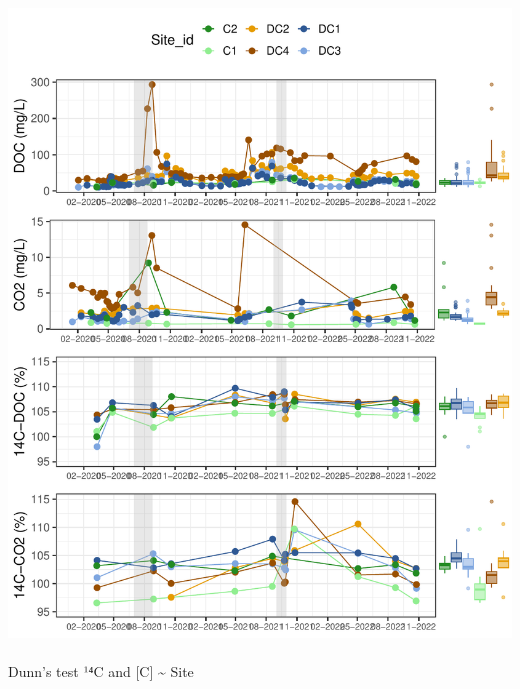 \documentclass[
  letterpaper,
  DIV=11,
  numbers=noendperiod]{scrartcl}
\makeatletter
\let\oldparagraph\paragraph
\renewcommand{\paragraph}{
    \@ifstar
      \xxxParagraphStar
      \xxxParagraphNoStar
  }
\newcommand{\xxxParagraphStar}[1]{\oldparagraph*{#1}\mbox{}}
\newcommand{\xxxParagraphNoStar}[1]{\oldparagraph{#1}\mbox{}}
\makeatother
\begin{document}
\includegraphics{index_files/figure-pdf/unnamed-chunk-3-1.pdf}

\paragraph{Dunn's test \textbar{} ¹⁴C and {[}C{]} \textasciitilde{}
Site}\label{dunns-test-uxb9ux2074c-and-c-site}
\end{document}
